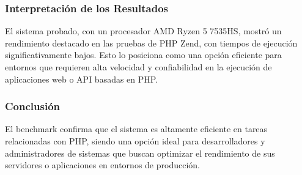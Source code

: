 \subsubsection{Interpretación de los Resultados}

El sistema probado, con un procesador AMD Ryzen 5 7535HS, mostró un rendimiento destacado en las pruebas de PHP Zend, con tiempos de ejecución significativamente bajos. Esto lo posiciona como una opción eficiente para entornos que requieren alta velocidad y confiabilidad en la ejecución de aplicaciones web o API basadas en PHP.

\subsubsection{Conclusión}

El benchmark confirma que el sistema es altamente eficiente en tareas relacionadas con PHP, siendo una opción ideal para desarrolladores y administradores de sistemas que buscan optimizar el rendimiento de sus servidores o aplicaciones en entornos de producción.







